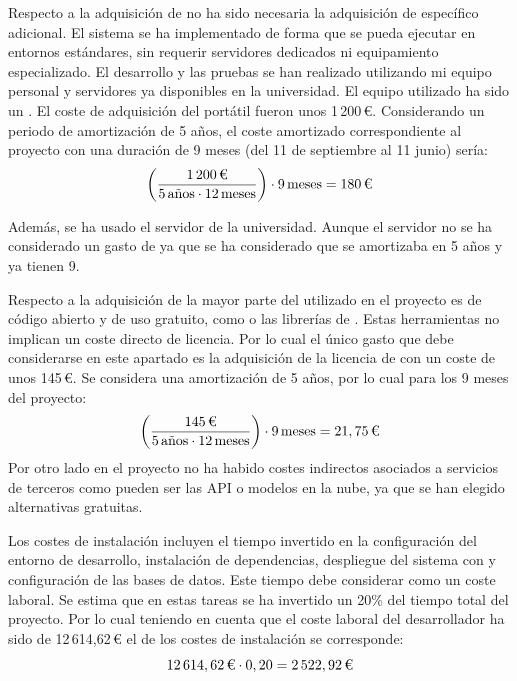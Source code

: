 Respecto a la adquisición de  no ha sido necesaria la adquisición de  específico adicional. El sistema  se ha implementado de forma que se pueda ejecutar en entornos estándares, sin requerir servidores dedicados ni equipamiento especializado. El desarrollo y las pruebas se han realizado utilizando mi equipo personal y servidores ya disponibles en la universidad. El equipo utilizado ha sido un . El coste de adquisición del portátil fueron unos 1\,200\,€. Considerando un periodo de amortización de 5 años, el coste amortizado correspondiente al proyecto con una duración de 9 meses (del 11 de septiembre al 11 junio) sería:
$$
\left(\frac{1\,200\,\text{\texteuro}}{5\,\text{años} \cdot 12\,\text{meses}}\right)\cdot 9\,\text{meses}
= 180\,\text{\texteuro}
$$

Además, se ha usado el servidor  de la universidad. Aunque el servidor no se ha considerado un gasto de  ya que se ha considerado que se amortizaba en 5 años y ya tienen 9.

Respecto a la adquisición de  la mayor parte del  utilizado en el proyecto es de código abierto y de uso gratuito, como  o las librerías de . Estas herramientas no implican un coste directo de licencia. Por lo cual el único gasto que debe considerarse en este apartado es la adquisición de la licencia de 
 con un coste de unos 145\,€. Se considera una amortización de 5 años, por lo cual para los 9 meses del proyecto:
$$
\left(\frac{145\,\text{\texteuro}}{5\,\text{años} \cdot 12\,\text{meses}}\right)\cdot 9\,\text{meses}
= 21,75\,\text{\texteuro}
$$
Por otro lado en el proyecto no ha habido costes indirectos asociados a servicios de terceros como pueden ser las API o modelos en la nube, ya que se han elegido alternativas gratuitas.

Los costes de instalación incluyen el tiempo invertido en la configuración del entorno de desarrollo, instalación de dependencias, despliegue del sistema con  y configuración de las bases de datos. Este tiempo debe considerar como un coste laboral. Se estima que en estas tareas se ha invertido un 20\% del tiempo total del proyecto. Por lo cual teniendo en cuenta que el coste laboral del desarrollador ha sido de 12\,614,62\,€ el de los costes de instalación se corresponde:
$$
12\,614,62\,\text{\texteuro} \cdot 0,20
= 2\,522,92\,\text{\texteuro}
$$

